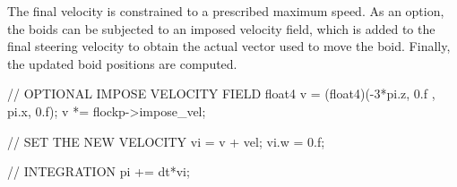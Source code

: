 The final velocity is constrained to a prescribed maximum speed. As an option, the boids can be subjected to an imposed velocity field, which is added to the final steering velocity to obtain the actual vector used to move the boid. Finally, the updated boid positions are computed. 

\begin{cppcode}{0}
// OPTIONAL IMPOSE VELOCITY FIELD
float4 v = (float4)(-3*pi.z, 0.f , pi.x, 0.f);
v *= flockp->impose_vel;

// SET THE NEW VELOCITY
vi = v + vel;
vi.w = 0.f;

// INTEGRATION
pi += dt*vi; 
\end{cppcode}
 


